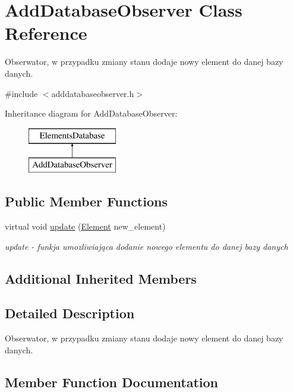 \hypertarget{class_add_database_observer}{}\section{Add\+Database\+Observer Class Reference}
\label{class_add_database_observer}


Obserwator, w przypadku zmiany stanu dodaje nowy element do danej bazy danych.  




{\ttfamily \#include $<$adddatabaseobserver.\+h$>$}

Inheritance diagram for Add\+Database\+Observer\+:\begin{figure}[H]
\begin{center}
\leavevmode
\includegraphics[height=2.000000cm]{class_add_database_observer}
\end{center}
\end{figure}
\subsection*{Public Member Functions}
\begin{DoxyCompactItemize}
\item 
virtual void \mbox{\hyperlink{class_add_database_observer_a6f2bc1af6f2887b326c40d2efec9cf42}{update}} (\mbox{\hyperlink{class_element}{Element}} new\+\_\+element)
\begin{DoxyCompactList}\small\item\em update -\/ funkja umozliwiająca dodanie nowego elementu do danej bazy danych \end{DoxyCompactList}\end{DoxyCompactItemize}
\subsection*{Additional Inherited Members}


\subsection{Detailed Description}
Obserwator, w przypadku zmiany stanu dodaje nowy element do danej bazy danych. 

\subsection{Member Function Documentation}
\mbox{\label{class_add_database_observer_a6f2bc1af6f2887b326c40d2efec9cf42}} 
